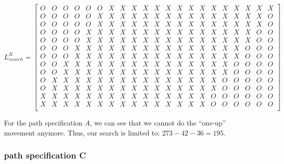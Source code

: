 \[ L_{search}^B = 
\left[
\begin{array}{cccccccccccccccccccccc}
 O & O & O & O & O & O & X & X & X & X & X & X & X & X & X & X & X & X & X & X & X \\
 O & O & O & O & O & X & X & X & X & X & X & X & X & X & X & X & X & X & X & X & O \\
 O & O & O & O & O & X & X & X & X & X & X & X & X & X & X & X & X & X & X & X & O \\
 O & O & O & O & X & X & X & X & X & X & X & X & X & X & X & X & X & X & X & O & O \\
 O & O & O & O & X & X & X & X & X & X & X & X & X & X & X & X & X & X & X & O & O \\
 O & O & O & X & X & X & X & X & X & X & X & X & X & X & X & X & X & X & O & O & O \\
 O & O & O & X & X & X & X & X & X & X & X & X & X & X & X & X & X & X & O & O & O \\
 O & O & X & X & X & X & X & X & X & X & X & X & X & X & X & X & X & O & O & O & O \\
 O & O & X & X & X & X & X & X & X & X & X & X & X & X & X & X & X & O & O & O & O \\
 O & X & X & X & X & X & X & X & X & X & X & X & X & X & X & X & O & O & O & O & O \\
 O & X & X & X & X & X & X & X & X & X & X & X & X & X & X & X & O & O & O & O & O \\
 X & X & X & X & X & X & X & X & X & X & X & X & X & X & X & O & O & O & O & O & O \\
 X & X & X & X & X & X & X & X & X & X & X & X & X & X & X & O & O & O & O & O & O \\
\end{array}
\right]
\]

For the path specification $A$, we can see that we cannot do the ``one-up'' movement anymore. Thus, our search is limited to: \textbf{$273-42-36=195$}.


\subsubsection*{path specification C} %
\label{ssub:path_specification_c}

